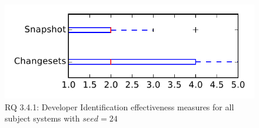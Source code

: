 
\begin{figure}
\centering
\includegraphics[height=0.4\textheight]{figures/dit_seed/rq1_tiny_24}
\caption{RQ 3.4.1: Developer Identification effectiveness measures for all subject systems with $seed=24$}
\label{fig:dit_seed:rq1:tiny}
\end{figure}
